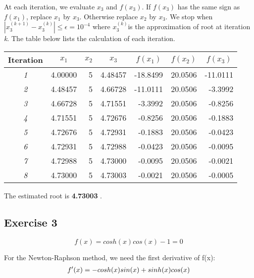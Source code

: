 \documentclass[12pt]{article}
\begin{document}
At each iteration, we evaluate \(x_3\) and \(f(x_3)\). If \(f(x_3)\) has the same sign as \(f(x_1)\), replace \(x_1\) by \(x_3\). Otherwise replace \(x_2\) by \(x_3\).
We stop when \(|x_3^{(k+1)}-x_3^{(k)}| \leq \epsilon = 10^{-4}\) where \(x_3^{(k)}\)is the approximation of root at iteration \textit{k}. The table below lists the calculation of each iteration.
\begin{table}[H]
\centering
\begin{tabular}{|c|r|r|r|r|r|r|}
\hline
\textbf{Iteration} & \multicolumn{1}{c|}{\textbf{\(x_1\)}} & \multicolumn{1}{c|}{\textbf{\(x_2\)}} & \multicolumn{1}{c|}{\textbf{\(x_3\)}} & \multicolumn{1}{c|}{\textbf{\(f(x_1)\)}} & \multicolumn{1}{c|}{\textbf{\(f(x_2)\)}} & \multicolumn{1}{c|}{\textbf{\(f(x_3)\)}} \\ \hline
\textit{1} & 4.00000 & 5 & 4.48457 & -18.8499 & 20.0506 & -11.0111 \\ \hline
\textit{2} & 4.48457 & 5 & 4.66728 & -11.0111 & 20.0506 & -3.3992 \\ \hline
\textit{3} & 4.66728 & 5 & 4.71551 & -3.3992 & 20.0506 & -0.8256 \\ \hline
\textit{4} & 4.71551 & 5 & 4.72676 & -0.8256 & 20.0506 & -0.1883 \\ \hline
\textit{5} & 4.72676 & 5 & 4.72931 & -0.1883 & 20.0506 & -0.0423 \\ \hline
\textit{6} & 4.72931 & 5 & 4.72988 & -0.0423 & 20.0506 & -0.0095 \\ \hline
\textit{7} & 4.72988 & 5 & 4.73000 & -0.0095 & 20.0506 & -0.0021 \\ \hline
\textit{8} & 4.73000 & 5 & 4.73003 & -0.0021 & 20.0506 & -0.0005 \\ \hline
\end{tabular}
\end{table}

The estimated root is \textbf{4.73003} .

\subsection{Exercise 3}

$$f(x) = cosh(x)cos(x)-1=0$$

For the Newton-Raphson method, we need the first derivative of f(x):
\begin{align}
f^\prime(x) = -cosh(x)sin(x) + sinh(x)cos(x) \notag
\end{align}
\end{document}
